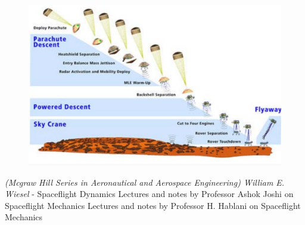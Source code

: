 \documentclass{article}
\theoremstyle{definition}
\begin{document}
\begin{figure}[h]
    \centering
    \includegraphics[scale=0.4]{full image 22.png}
    \caption{}
    \label{fig:mars2}
\end{figure}

\begin{thebibliography}{}
\emph{(Mcgraw Hill Series in Aeronautical and Aerospace Engineering) William E. Wiesel} - Spaceflight Dynamics
Lectures and notes by Professor Ashok Joshi on Spaceflight Mechanics
Lectures and notes by Professor H. Hablani on Spaceflight Mechanics
\end{thebibliography}
\end{document}
